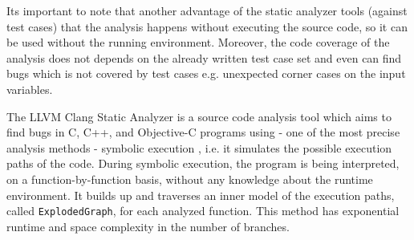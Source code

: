 Its important to note that another advantage of the static analyzer tools 
(against test cases) that the analysis happens without executing the source 
code, so it can be used without the running environment. Moreover, the code 
coverage of the analysis does not depends on the already written test case set 
and even can find bugs which is not covered by test cases e.g. unexpected 
corner cases on the input variables. 

The LLVM Clang Static Analyzer is a source code analysis tool which aims to 
find bugs in C,
C++, and Objective-C programs using - one of the most precise analysis methods 
- symbolic execution  \cite{King1975} \cite{Hampapuram2005}, i.e. it simulates 
the possible execution paths of the code. During symbolic execution, the 
program is being interpreted, on a function-by-function basis, without any 
knowledge about the runtime environment. It builds up and traverses an inner 
model of the execution paths, called \texttt{ExplodedGraph}, for each analyzed 
function. This method has exponential runtime and space complexity in the 
number of branches.

